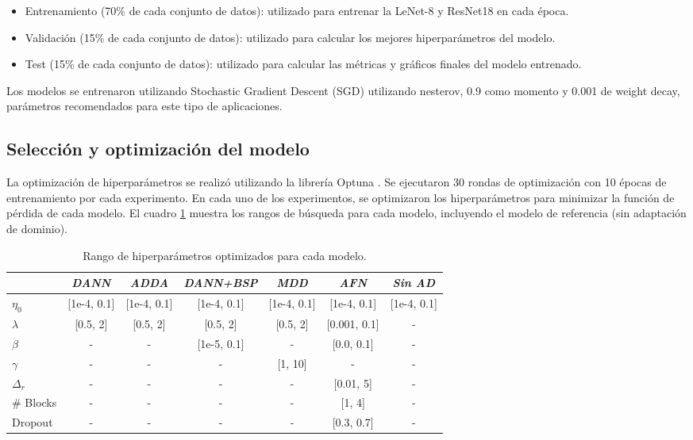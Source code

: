 \begin{itemize}
    \item Entrenamiento (70\% de cada conjunto de datos): utilizado para entrenar la LeNet-8 y ResNet18 en cada época.
    \item Validación (15\% de cada conjunto de datos): utilizado para calcular los mejores hiperparámetros del modelo.
    \item Test (15\% de cada conjunto de datos): utilizado para calcular las métricas y gráficos finales del modelo entrenado.
\end{itemize}

Los modelos se entrenaron utilizando Stochastic Gradient Descent (SGD) \parencite{sutskever2013importance} utilizando nesterov, 0.9 como momento y 0.001 de weight decay, parámetros recomendados
para este tipo de aplicaciones.

\subsection{Selección y optimización del modelo}

La optimización de hiperparámetros se realizó utilizando la librería Optuna \parencite{optuna_2019}. Se ejecutaron 30 rondas de optimización con 10 épocas de entrenamiento por cada experimento. En
cada uno de los experimentos, se optimizaron los hiperparámetros para minimizar la función de pérdida de cada modelo.
El cuadro \ref{tab:rangos-hiperparametros} muestra los rangos de búsqueda para cada modelo, incluyendo el modelo de
referencia (sin adaptación de dominio).

\begin{table}[H]
    \centering
    \begin{tabular}{l|cccccc}
        \toprule
                   & {\it DANN}  & {\it ADDA}  & {\it DANN+BSP} & {\it MDD}   & {\it AFN}    & {\it Sin AD} \\
        \midrule
        $\eta_0$   & [1e-4, 0.1] & [1e-4, 0.1] & [1e-4, 0.1]    & [1e-4, 0.1] & [1e-4, 0.1]  & [1e-4, 0.1]  \\
        $\lambda$  & [0.5, 2]    & [0.5, 2]    & [0.5, 2]       & [0.5, 2]    & [0.001, 0.1] & -            \\
        $\beta$    & -           & -           & [1e-5, 0.1]    & -           & [0.0, 0.1]   & -            \\
        $\gamma$   & -           & -           & -              & [1, 10]     & -            & -            \\
        $\Delta_r$ & -           & -           & -              & -           & [0.01, 5]    & -            \\
        \# Blocks  & -           & -           & -              & -           & [1, 4]       & -            \\
        Dropout    & -           & -           & -              & -           & [0.3, 0.7]   & -            \\
        \bottomrule
    \end{tabular}
    \caption[Rango de hiperparámetros optimizados]{Rango de hiperparámetros optimizados para cada modelo.}
    \label{tab:rangos-hiperparametros}
\end{table}

